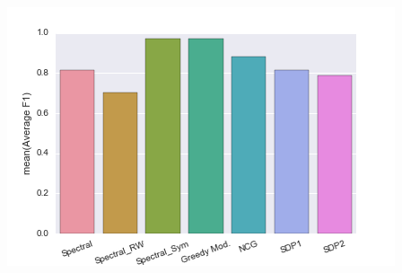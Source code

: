 \documentclass{beamer}
\theoremstyle{definition}
\theoremstyle{plain}
\theoremstyle{remark}
\begin{document}
\begin{frame}{}
\begin{columns}
						\includegraphics[width=0.9\linewidth]{Images/karate_AverageF1.png}
				\end{columns}
				
		\end{frame}


	\section*{}

		\begin{frame}{}
		\end{frame}
\end{document}
